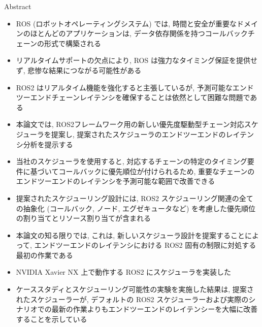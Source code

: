 
\begin{frame}{Abstract}
    \begin{itemize}
        \item ROS (ロボットオペレーティングシステム) では, 時間と安全が重要なドメインのほとんどのアプリケーションは, データ依存関係を持つコールバックチェーンの形式で構築される
\item リアルタイムサポートの欠点により, ROS は強力なタイミング保証を提供せず, 悲惨な結果につながる可能性がある
\item ROS2 はリアルタイム機能を強化すると主張しているが, 予測可能なエンドツーエンドチェーンレイテンシを確保することは依然として困難な問題である
\item 本論文では, ROS2フレームワーク用の新しい優先度駆動型チェーン対応スケジューラを提案し, 提案されたスケジューラのエンドツーエンドのレイテンシ分析を提示する
\item 当社のスケジューラを使用すると, 対応するチェーンの特定のタイミング要件に基づいてコールバックに優先順位が付けられるため, 重要なチェーンのエンドツーエンドのレイテンシを予測可能な範囲で改善できる
\item 提案されたスケジューリング設計には, ROS2 スケジューリング関連の全ての抽象化 (コールバック, ノード, エグゼキュータなど) を考慮した優先順位の割り当てとリソース割り当てが含まれる
\item 本論文の知る限りでは, これは, 新しいスケジューラ設計を提案することによって, エンドツーエンドのレイテンシにおける ROS2 固有の制限に対処する最初の作業である
\item NVIDIA Xavier NX 上で動作する ROS2 にスケジューラを実装した
\item ケーススタディとスケジューリング可能性の実験を実施した結果は, 提案されたスケジューラーが, デフォルトの ROS2 スケジューラーおよび実際のシナリオでの最新の作業よりもエンドツーエンドのレイテンシーを大幅に改善することを示している
    \end{itemize}
\end{frame}
